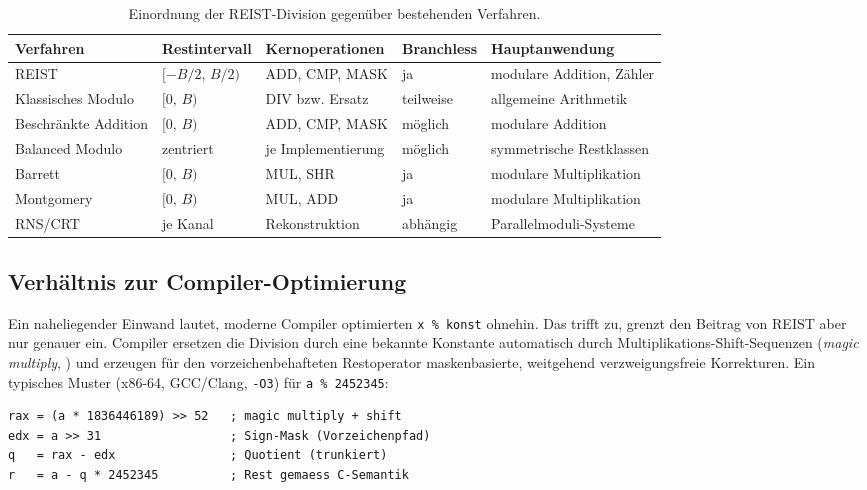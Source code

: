\documentclass[11pt,a4paper]{scrartcl}
\theoremstyle{definition}
\theoremstyle{plain}
\theoremstyle{remark}
\begin{document}
\begin{table}[htbp]
\centering
\caption{Einordnung der REIST-Division gegenüber bestehenden Verfahren.}
\label{tab:vergleich}
\footnotesize
\begin{tabular}{lllll}
\toprule
Verfahren & Restintervall & Kernoperationen & Branchless & Hauptanwendung \\
\midrule
REIST & $[-B/2,\, B/2)$ & ADD, CMP, MASK & ja & modulare Addition, Zähler \\
Klassisches Modulo & $[0,\, B)$ & DIV bzw. Ersatz & teilweise & allgemeine Arithmetik \\
Beschränkte Addition & $[0,\, B)$ & ADD, CMP, MASK & möglich & modulare Addition \\
Balanced Modulo & zentriert & je Implementierung & möglich & symmetrische Restklassen \\
Barrett & $[0,\, B)$ & MUL, SHR & ja & modulare Multiplikation \\
Montgomery & $[0,\, B)$ & MUL, ADD & ja & modulare Multiplikation \\
RNS/CRT & je Kanal & Rekonstruktion & abhängig & Parallelmoduli-Systeme \\
\bottomrule
\end{tabular}
\end{table}

\subsection{Verhältnis zur Compiler-Optimierung}
\label{sec:compiler}

Ein naheliegender Einwand lautet, moderne Compiler optimierten \texttt{x \% konst} ohnehin. Das trifft zu, grenzt den Beitrag von REIST aber nur genauer ein. Compiler ersetzen die Division durch eine bekannte Konstante automatisch durch Multiplikations-Shift-Sequenzen (\emph{magic multiply}, \cite{granlund}) und erzeugen für den vorzeichenbehafteten Restoperator maskenbasierte, weitgehend verzweigungsfreie Korrekturen. Ein typisches Muster (x86-64, GCC/Clang, \texttt{-O3}) für \texttt{a \% 2452345}:

\noindent\begin{minipage}{\linewidth}
\begin{lstlisting}[language={},caption={Vom Compiler erzeugtes Muster für \texttt{a \% konst} (schematisch).},label={lst:magic}]
rax = (a * 1836446189) >> 52   ; magic multiply + shift
edx = a >> 31                  ; Sign-Mask (Vorzeichenpfad)
q   = rax - edx                ; Quotient (trunkiert)
r   = a - q * 2452345          ; Rest gemaess C-Semantik
\end{lstlisting}
\end{minipage}
\end{document}
